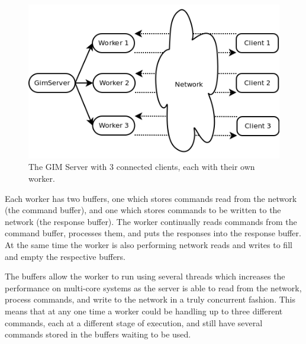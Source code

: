 \begin{figure}
    \begin{center}
        \includegraphics[scale=0.6]{Design/diagrams/server_workers.png}
        \caption{The GIM Server with 3 connected clients, each with their own worker.}
        \label{WorkersDia}
    \end{center}
\end{figure}

Each worker has two buffers, one which stores commands read from the network (the command buffer), and one which stores commands to be written to the network (the response buffer). The worker continually reads commands from the command buffer, processes them, and puts the responses into the response buffer. At the same time the worker is also performing network reads and writes to fill and empty the respective buffers.

The buffers allow the worker to run using several threads which increases the performance on multi-core systems as the server is able to read from the network, process commands, and write to the network in a truly concurrent fashion. This means that at any one time a worker could be handling up to three different commands, each at a different stage of execution, and still have several commands stored in the buffers waiting to be used.

